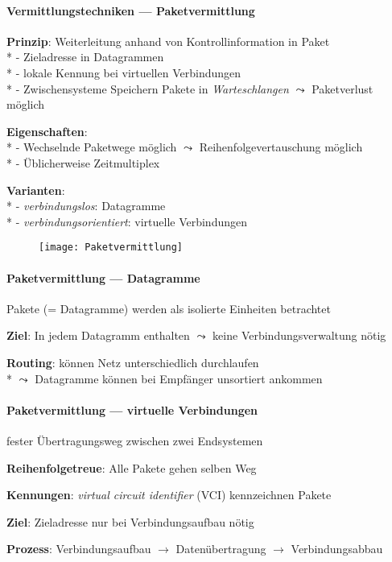 \paragraph{Vermittlungstechniken --- Paketvermittlung}
\begin{items}
  \item \textbf{Prinzip}: Weiterleitung anhand von Kontrollinformation in Paket \\*
    - Zieladresse in Datagrammen \\*
    - lokale Kennung bei virtuellen Verbindungen \\*
    - Zwischensysteme Speichern Pakete in \emph{Warteschlangen} \( \leadsto \) Paketverlust möglich
  \item \textbf{Eigenschaften}: \\*
    - Wechselnde Paketwege möglich \( \leadsto \) Reihenfolgevertauschung möglich \\*
    - Üblicherweise Zeitmultiplex
  \item \textbf{Varianten}: \\*
    - \emph{verbindungslos}: Datagramme \\*
    - \emph{verbindungsorientiert}: virtuelle Verbindungen
\end{items}
\begin{figure}[H]\centering\label{Paketvermittlung}\texttt{[image: Paketvermittlung]}\end{figure}

\paragraph{Paketvermittlung --- Datagramme}
\begin{items}
  \item Pakete (= Datagramme) werden als isolierte Einheiten betrachtet
  \item \textbf{Ziel}: In jedem Datagramm enthalten \( \leadsto \) keine Verbindungsverwaltung nötig
  \item \textbf{Routing}: können Netz unterschiedlich durchlaufen \\*
    \( \leadsto \) Datagramme können bei Empfänger unsortiert ankommen
\end{items}

\paragraph{Paketvermittlung --- virtuelle Verbindungen}
\begin{items}
  \item fester Übertragungsweg zwischen zwei Endsystemen
  \item \textbf{Reihenfolgetreue}: Alle Pakete gehen selben Weg
  \item \textbf{Kennungen}: \emph{virtual circuit identifier} (VCI) kennzeichnen Pakete
  \item \textbf{Ziel}: Zieladresse nur bei Verbindungsaufbau nötig
  \item \textbf{Prozess}: Verbindungsaufbau \( \to \) Datenübertragung \( \to \) Verbindungsabbau
\end{items}

